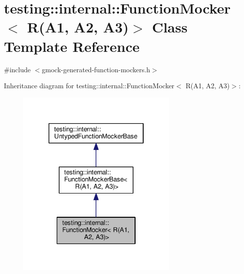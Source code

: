 \hypertarget{classtesting_1_1internal_1_1FunctionMocker_3_01R_07A1_00_01A2_00_01A3_08_4}{}\section{testing\+:\+:internal\+:\+:Function\+Mocker$<$ R(A1, A2, A3)$>$ Class Template Reference}
\label{classtesting_1_1internal_1_1FunctionMocker_3_01R_07A1_00_01A2_00_01A3_08_4}


{\ttfamily \#include $<$gmock-\/generated-\/function-\/mockers.\+h$>$}



Inheritance diagram for testing\+:\+:internal\+:\+:Function\+Mocker$<$ R(A1, A2, A3)$>$\+:\nopagebreak
\begin{figure}[H]
\begin{center}
\leavevmode
\includegraphics[width=226pt]{classtesting_1_1internal_1_1FunctionMocker_3_01R_07A1_00_01A2_00_01A3_08_4__inherit__graph}
\end{center}
\end{figure}


